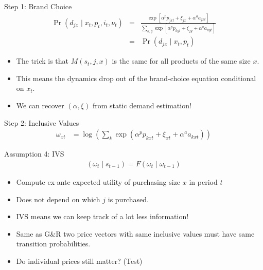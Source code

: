 \documentclass[aspectratio=169,11pt]{beamer}
\begin{document}
\begin{frame}{Step 1: Brand Choice}
\begin{eqnarray*}
\Pr(d_{jx} \mid x_t, p_t,i_t,\nu_t) &=& \frac{\exp[\alpha^p p_{jxt} + \xi_{jx} + \alpha^a a_{jxt}]}{\sum_{k,y} \exp[\alpha^p p_{kyt} + \xi_{jy} + \alpha^a a_{kyt}  ] }\\
&=& \Pr(d_{jx} \mid x_t, p_t)
\end{eqnarray*}
\begin{itemize}
\item The trick is that $M(s_t,j,x)$ is the same for all products of the same size $x$.
\item This means the dynamics drop out of the brand-choice equation conditional on $x_t$.
\item We can recover $(\alpha, \xi)$ from static demand estimation!
\end{itemize}
\end{frame}

\begin{frame}{Step 2: Inclusive Values}
\begin{align*}
\omega_{xt} &= \log \left( \sum_k \exp(\alpha^p p_{kxt} + \xi_{xt} + \alpha^a a_{kxt}) \right)
\end{align*}
\vspace{-0.5cm}
\begin{block}{Assumption 4: IVS}
\begin{align*}
(\omega_t \mid s_{t-1}) = F(\omega_t \mid \omega_{t-1})
\end{align*}
\end{block}
\begin{itemize}
\item Compute ex-ante expected utility of purchasing size $x$ in period $t$
\item Does not depend on which $j$ is purchased.
\item IVS means we can keep track of a lot less information!
\item Same as G\&R two price vectors with same inclusive values must have same transition probabilities.
\item Do individual prices still matter? (Test)
\end{itemize}
\end{frame}
\end{document}
